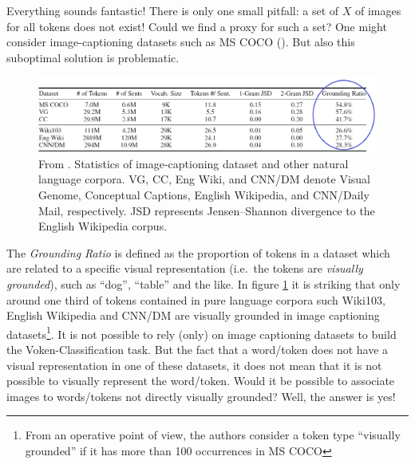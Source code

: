 \documentclass[
]{krantz}
\begin{document}
Everything sounds fantastic! There is only one small pitfall: a set of \(X\) of images for all tokens does not exist! Could we find a proxy for such a set? One might consider image-captioning datasets such as MS COCO (\citet{lin2014microsoft}). But also this suboptimal solution is problematic.

\begin{figure}

{\centering \includegraphics[width=1\linewidth]{figures/02-03-img-support-text/img-tan2020-01} 

}

\caption{From \citet{tan2020vokenization}. Statistics of image-captioning dataset and other natural language corpora. VG, CC, Eng Wiki, and CNN/DM denote Visual Genome, Conceptual Captions, English Wikipedia, and CNN/Daily Mail, respectively. JSD represents Jensen--Shannon divergence to the English Wikipedia corpus.}\label{fig:img-tan2020-01}
\end{figure}



The \emph{Grounding Ratio} is defined as the proportion of tokens in a dataset which are related to a specific visual representation (i.e.~the tokens are \emph{visually grounded}), such as ``dog'', ``table'' and the like. In figure \ref{fig:img-tan2020-01} it is striking that only around one third of tokens contained in pure language corpora such Wiki103, English Wikipedia and CNN/DM are visually grounded in image captioning datasets\footnote{From an operative point of view, the authors consider a token type ``visually grounded'' if it has more than 100 occurrences in MS COCO}. It is not possible to rely (only) on image captioning datasets to build the Voken-Classification task. But the fact that a word/token does not have a visual representation in one of these datasets, it does not mean that it is not possible to visually represent the word/token. Would it be possible to associate images to words/tokens not directly visually grounded? Well, the answer is yes!
\end{document}
